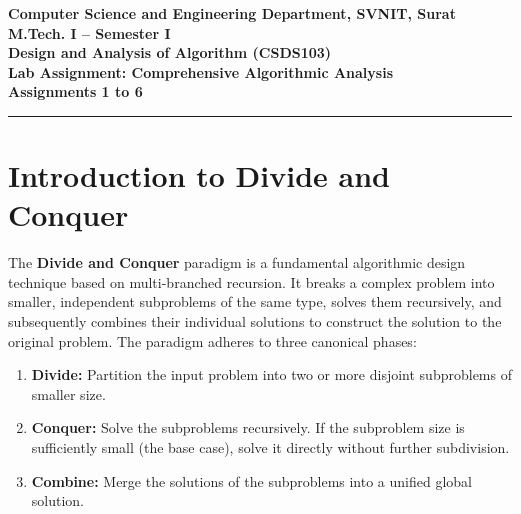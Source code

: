 \documentclass[12pt]{article}
\begin{document}

\begin{center}
\textbf{Computer Science and Engineering Department, SVNIT, Surat}\\
\textbf{M.Tech. I -- Semester I}\\
\textbf{Design and Analysis of Algorithm (CSDS103)}\\
\textbf{Lab Assignment: Comprehensive Algorithmic Analysis}\\
\textbf{Assignments 1 to 6}
\end{center}
\vspace{-4pt}
\hrule
\vspace{4pt}

\vspace{0.3cm}

\section{Introduction to Divide and Conquer}

The \textbf{Divide and Conquer} paradigm is a fundamental algorithmic design technique based on multi-branched recursion. It breaks a complex problem into smaller, independent subproblems of the same type, solves them recursively, and subsequently combines their individual solutions to construct the solution to the original problem. The paradigm adheres to three canonical phases:
\begin{enumerate}
    \item \textbf{Divide:} Partition the input problem into two or more disjoint subproblems of smaller size.
    \item \textbf{Conquer:} Solve the subproblems recursively. If the subproblem size is sufficiently small (the base case), solve it directly without further subdivision.
    \item \textbf{Combine:} Merge the solutions of the subproblems into a unified global solution.
\end{enumerate}
\end{document}

